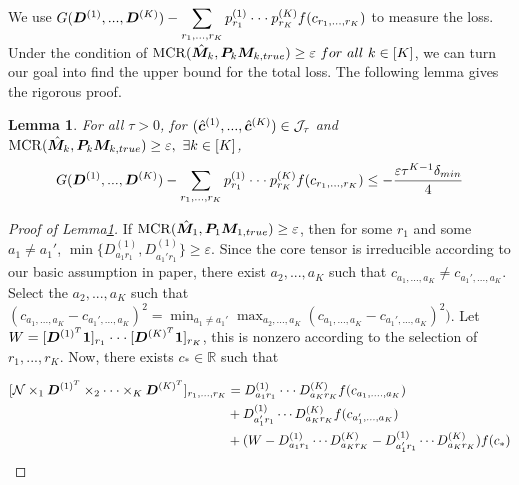 \documentclass{article}
\newtheorem{lemma}{Lemma}
\DeclareMathOperator*{\mcr}{MCR}
\begin{document}
\begin{appendices}
We use $ G(\boldsymbol{D}^{(1)},...,\boldsymbol{D}^{(K)})-\displaystyle\sum_{r_1,...,r_K}p_{r_1}^{(1)}\cdot\cdot\cdot p_{r_K}^{(K)}f(c_{r_1,...,r_K})$ to measure the loss. 
 Under the condition of $\mcr(\hat{\mM}_k, \mP_k\mM_{k,true})\geq \varepsilon~for~all~k\in[K]$, we can turn our goal into find the upper bound for the total loss. The following lemma gives the rigorous proof.
 \begin{lemma}
\label{1}
For all $\tau>0$, for $(\hat{\boldsymbol{c}}^{(1)},...,\hat{\boldsymbol{c}}^{(K)})\in \mathcal{J}_\tau$ and $\mcr(\hat{\mM}_k, \mP_k\mM_{k,true})\geq \varepsilon,~\exists k\in[K]$,
\begin{equation*}
    G(\boldsymbol{D}^{(1)},...,\boldsymbol{D}^{(K)})-\displaystyle\sum_{r_1,...,r_K}p_{r_1}^{(1)}\cdot\cdot\cdot p_{r_K}^{(K)}f(c_{r_1,...,r_K})\leq -\frac{\varepsilon\tau^{K-1}\delta_{min}}{4}
\end{equation*}
\end{lemma}

\begin{proof}[Proof of Lemma\ref{1}]
If $\mcr(\hat{\mM}_1, \mP_1\mM_{1,true})\geq \varepsilon$, then for some $r_1$ and some $a_1\neq a_1'$, $\min\{D_{a_1r_1}^{(1)}, D_{a_1'r_1}^{(1)}\}\geq \varepsilon$. Since the core tensor is irreducible according to our basic assumption in paper, there exist $a_2,...,a_K$ such that $c_{a_1,...,a_K}\neq c_{a_1',...,a_K}$. Select the $a_2,...,a_K$ such that $(c_{a_1,...,a_K}-c_{a_1',...,a_K})^2 = \displaystyle\min_{a_1\neq a_1'}\max_{a_2,...,a_K}(c_{a_1,...,a_K}-c_{a_1',...,a_K})^2)$. 
Let $W = [\boldsymbol{D}^{(1)^T}\boldsymbol{1}]_{r_1}\cdot\cdot\cdot [\boldsymbol{D}^{(K)^T}\boldsymbol{1}]_{r_K}$, this is nonzero according to the selection of $r_1,...,r_K$. Now, there exists $c_*\in\mathbb{R}$ such that

\begin{equation}
\begin{split}
    [\mathcal{N}\times_1\boldsymbol{D}^{(1)^T}\times_2\cdot\cdot\cdot\times_K \boldsymbol{D}^{(K)^T}]_{r_1,...,r_K}&=
 D_{a_1r_1}^{(1)}\cdot\cdot\cdot D_{a_Kr_K}^{(K)}f(c_{a_1,....,a_K})\\
 &+D_{a_1'r_1}^{(1)}\cdots D_{a_Kr_K}^{(K)}f(c_{a_1',...,a_K})\\
    &+(W-D_{a_1r_1}^{(1)}\cdots D_{a_Kr_K}^{(K)}-D_{a_1'r_1}^{(1)}\cdots D_{a_Kr_K}^{(K)})f(c_*)
\end{split}
\end{equation}


\end{proof}
\end{appendices}
\end{document}
